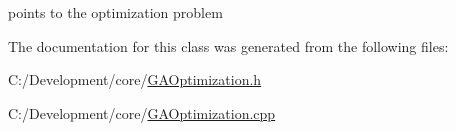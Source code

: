 points to the optimization problem 



The documentation for this class was generated from the following files\-:\begin{DoxyCompactItemize}
\item 
C\-:/\-Development/core/\hyperlink{_g_a_optimization_8h}{G\-A\-Optimization.\-h}\item 
C\-:/\-Development/core/\hyperlink{_g_a_optimization_8cpp}{G\-A\-Optimization.\-cpp}\end{DoxyCompactItemize}
